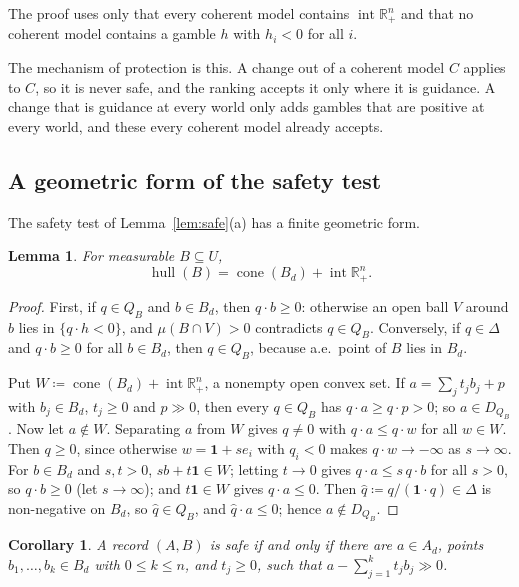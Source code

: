 \documentclass[11pt]{article}
\newcommand{\R}{\mathbb{R}}
\newcommand{\one}{\mathbf{1}}
\newcommand{\hull}{\operatorname{hull}}
\newcommand{\Rpp}{\inter\R^n_{+}}
\DeclareMathOperator{\cone}{cone}
\DeclareMathOperator{\inter}{int}
\theoremstyle{plain}
\newtheorem{lemma}[theorem]{Lemma}
\newtheorem{corollary}[theorem]{Corollary}
\theoremstyle{definition}
\theoremstyle{remark}
\begin{document}
The proof uses only that every coherent model contains $\Rpp$ and that no coherent model
contains a gamble $h$ with $h_i<0$ for all $i$.

The mechanism of protection is this. A change out of a coherent model $C$ applies to
$C$, so it is never safe, and the ranking accepts it only where it is guidance. A change
that is guidance at every world only adds gambles that are positive at every world, and
these every coherent model already accepts.

\subsection{A geometric form of the safety test}

The safety test of Lemma~\ref{lem:safe}(a) has a finite geometric form.

\begin{lemma}\label{lem:hullformula}
For measurable $B\subseteq U$,
\[
  \hull(B)=\cone(B_d)+\Rpp .
\]
\end{lemma}

\begin{proof}
First, if $q\in Q_B$ and $b\in B_d$, then $q\cdot b\ge0$: otherwise an open ball $V$
around $b$ lies in $\{q\cdot h<0\}$, and $\mu(B\cap V)>0$ contradicts $q\in Q_B$.
Conversely, if $q\in\Delta$ and $q\cdot b\ge0$ for all $b\in B_d$, then $q\in Q_B$,
because a.e.\ point of $B$ lies in $B_d$.

Put $W\coloneqq\cone(B_d)+\Rpp$, a nonempty open convex set. If $a=\sum_jt_jb_j+p$
with $b_j\in B_d$, $t_j\ge0$ and $p\gg0$, then every $q\in Q_B$ has $q\cdot a\ge
q\cdot p>0$; so $a\in D_{Q_B}$. Now let $a\notin W$. Separating $a$ from $W$ gives
$q\ne0$ with $q\cdot a\le q\cdot w$ for all $w\in W$. Then $q\ge0$, since otherwise
$w=\one+se_i$ with $q_i<0$ makes $q\cdot w\to-\infty$ as $s\to\infty$. For $b\in B_d$
and $s,t>0$, $sb+t\one\in W$; letting $t\to0$ gives $q\cdot a\le s\,q\cdot b$ for all
$s>0$, so $q\cdot b\ge0$ (let $s\to\infty$); and $t\one\in W$ gives $q\cdot a\le0$. Then
$\hat q\coloneqq q/(\one\cdot q)\in\Delta$ is non-negative on $B_d$, so $\hat q\in Q_B$,
and $\hat q\cdot a\le0$; hence $a\notin D_{Q_B}$.
\end{proof}

\begin{corollary}\label{cor:witness}
A record $(A,B)$ is safe if and only if there are $a\in A_d$, points $b_1,\dots,b_k\in
B_d$ with $0\le k\le n$, and $t_j\ge0$, such that $a-\sum_{j=1}^kt_jb_j\gg0$.
\end{corollary}
\end{document}
